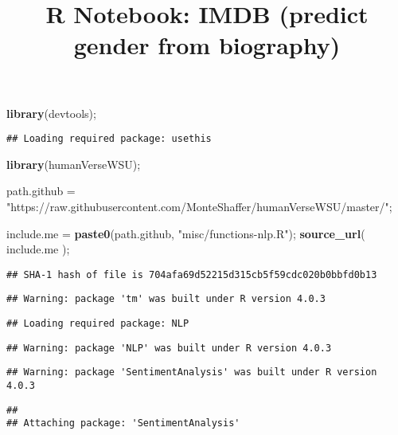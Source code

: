 \documentclass[
]{article}
\title{R Notebook: IMDB (predict gender from biography)}
\author{}
\date{\vspace{-2.5em}}
\newenvironment{Shaded}{\begin{snugshade}}{\end{snugshade}}
\newcommand{\KeywordTok}[1]{\textcolor[rgb]{0.13,0.29,0.53}{\textbf{#1}}}
\newcommand{\NormalTok}[1]{#1}
\newcommand{\StringTok}[1]{\textcolor[rgb]{0.31,0.60,0.02}{#1}}
\begin{document}
\maketitle

{
\setcounter{tocdepth}{5}
\tableofcontents
}
\begin{Shaded}
\begin{Highlighting}[]
\KeywordTok{library}\NormalTok{(devtools);}
\end{Highlighting}
\end{Shaded}

\begin{verbatim}
## Loading required package: usethis
\end{verbatim}

\begin{Shaded}
\begin{Highlighting}[]
\KeywordTok{library}\NormalTok{(humanVerseWSU);}

\NormalTok{path.github =}\StringTok{ "https://raw.githubusercontent.com/MonteShaffer/humanVerseWSU/master/"}\NormalTok{;}

\NormalTok{include.me =}\StringTok{ }\KeywordTok{paste0}\NormalTok{(path.github, }\StringTok{"misc/functions{-}nlp.R"}\NormalTok{);}
\KeywordTok{source\_url}\NormalTok{( include.me );}
\end{Highlighting}
\end{Shaded}

\begin{verbatim}
## SHA-1 hash of file is 704afa69d52215d315cb5f59cdc020b0bbfd0b13
\end{verbatim}

\begin{verbatim}
## Warning: package 'tm' was built under R version 4.0.3
\end{verbatim}

\begin{verbatim}
## Loading required package: NLP
\end{verbatim}

\begin{verbatim}
## Warning: package 'NLP' was built under R version 4.0.3
\end{verbatim}

\begin{verbatim}
## Warning: package 'SentimentAnalysis' was built under R version 4.0.3
\end{verbatim}

\begin{verbatim}
## 
## Attaching package: 'SentimentAnalysis'
\end{verbatim}
\end{document}
